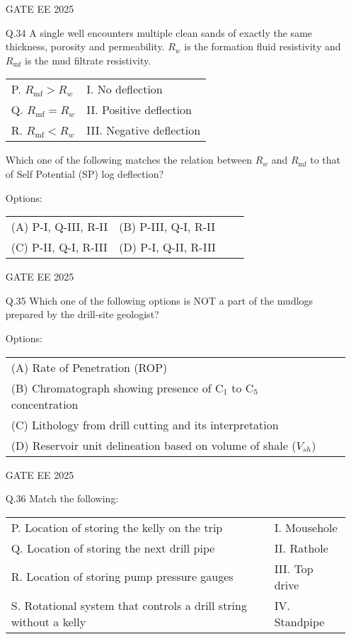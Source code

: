 \documentclass{article}
\begin{document}
\begin{enumerate}[leftmargin=*,series=q]
GATE EE 2025
 \vspace{0.5cm} 
\item[Q.34] A single well encounters multiple clean sands of exactly the same thickness, porosity and permeability. $R_w$ is the formation fluid resistivity and $R_{\text{mf}}$ is the mud filtrate resistivity.

\begin{tabular}{ll}
P. $R_{\text{mf}} > R_w$ & I. No deflection \\
Q. $R_{\text{mf}} = R_w$ & II. Positive deflection \\
R. $R_{\text{mf}} < R_w$ & III. Negative deflection \\
\end{tabular}

Which one of the following matches the relation between $R_w$ and $R_{\text{mf}}$ to that of Self Potential (SP) log deflection?

Options:
\begin{tabular}{llll}
(A) P-I, Q-III, R-II & (B) P-III, Q-I, R-II \\
(C) P-II, Q-I, R-III & (D) P-I, Q-II, R-III
\end{tabular}

GATE EE 2025
 \vspace{0.5cm} 
\item[Q.35] Which one of the following options is NOT a part of the mudlogs prepared by the drill-site geologist?

Options:
\begin{tabular}{ll}
(A) Rate of Penetration (ROP) \\
(B) Chromatograph showing presence of C$_1$ to C$_5$ concentration \\
(C) Lithology from drill cutting and its interpretation \\
(D) Reservoir unit delineation based on volume of shale ($V_{sh}$)
\end{tabular}

GATE EE 2025
 \vspace{0.5cm} 
\item[Q.36] Match the following:

\begin{tabular}{ll}
P. Location of storing the kelly on the trip & I. Mousehole \\
Q. Location of storing the next drill pipe & II. Rathole \\
R. Location of storing pump pressure gauges & III. Top drive \\
S. Rotational system that controls a drill string without a kelly & IV. Standpipe \\
\end{tabular}


\end{enumerate}
\end{document}
